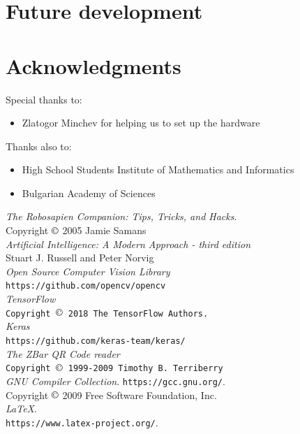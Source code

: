 \documentclass[a4paper, 12pt]{article}
\begin{document}
	\section{Future development}
	
	\section{Acknowledgments}
	Special thanks to:
	\begin{itemize}
		\item Zlatogor Minchev for helping us to set up the hardware
	\end{itemize}
	Thanks also to:
	\begin{itemize}
		\item High School Students Institute of Mathematics and Informatics
		\item Bulgarian Academy of Sciences
	\end{itemize}
	\begin{thebibliography}{99}
		{\itshape The Robosapien Companion: Tips, Tricks, and Hacks}.\\
		Copyright $\copyright$ 2005 Jamie Samans\\
		{\itshape Artificial Intelligence: A Modern Approach - third edition}\\
		Stuart J. Russell and Peter Norvig\\
		
		{\itshape Open Source Computer Vision Library}\\
		\texttt{https://github.com/opencv/opencv} \\
		
		{\itshape TensorFlow}\\
		\texttt{Copyright $\copyright$ 2018 The TensorFlow Authors.} \\
		
		{\itshape Keras}\\
		\texttt{https://github.com/keras-team/keras/} \\
		
		{\itshape The ZBar QR Code reader} \\
		\texttt{Copyright $\copyright$ 1999-2009 Timothy B. Terriberry} \\
		
		{\itshape GNU Compiler Collection}.
		\texttt{https://gcc.gnu.org/}. \\
		Copyright $\copyright$  2009 Free Software Foundation, Inc. \\
		
		{\itshape \LaTeX}.\\
		\texttt{https://www.latex-project.org/}.
	\end{thebibliography}
\end{document}
